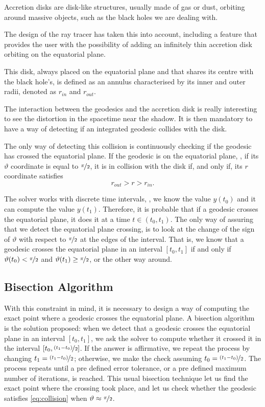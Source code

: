 Accretion disks are disk-like structures, usually made of gas or dust, orbiting around massive objects, such as the black holes we are dealing with.

The design of the ray tracer has taken this into account, including a feature that provides the user with the possibility of adding an infinitely thin accretion disk orbiting on the equatorial plane.

This disk, always placed on the equatorial plane and that shares its centre with the black hole's, is defined as an annulus characterised by its inner and outer radii, denoted as $r_{in}$ and $r_{out}$.

The interaction between the geodesics and the accretion disk is really interesting to see the distortion in the spacetime near the shadow. It is then mandatory to have a way of detecting if an integrated geodesic collides with the disk.

The only way of detecting this collision is continuously checking if the geodesic has crossed the equatorial plane. If the geodesic is on the equatorial plane, \ie, if its $\vartheta$ coordinate is equal to $\nicefrac{\pi}{2}$, it is in collision with the disk if, and only if, its $r$ coordinate satisfies
\begin{equation}
	\label{eq:collision}
	r_{out} > r > r_{in}.
\end{equation}

The solver works with discrete time intervals, \ie, we know the value $y(t_0)$ and it can compute the value $y(t_1)$. Therefore, it is probable that if a geodesic crosses the equatorial plane, it does it at a time $t \in (t_0, t_1)$. The only way of assuring that we detect the equatorial plane crossing, is to look at the change of the sign of $\vartheta$ with respect to $\nicefrac{\pi}{2}$ at the edges of the interval. That is, we know that a geodesic crosses the equatorial plane in an interval $[t_0, t_1]$ if and only if $\vartheta(t_0) < \nicefrac{\pi}{2}$ and $\vartheta(t_1) \geq \nicefrac{\pi}{2}$, or the other way around.

\subsection{Bisection Algorithm}

With this constraint in mind, it is necessary to design a way of computing the exact point where a geodesic crosses the equatorial plane. A bisection algorithm is the solution proposed: when we detect that a geodesic crosses the equatorial plane in an interval $[t_0, t_1]$, we ask the solver to compute whether it crossed it in the interval $[t_0, \nicefrac{(t_1 - t_0)}{2}]$. If the answer is affirmative, we repeat the process by changing $t_1 = \nicefrac{(t_1 - t_0)}{2}$; otherwise, we make the check assuming $t_0 = \nicefrac{(t_1 - t_0)}{2}$. The process repeats until a pre defined error tolerance, or a pre defined maximum number of iterations, is reached. This usual bisection technique let us find the exact point where the crossing took place, and let us check whether the geodesic satisfies \autoref{eq:collision} when $\vartheta \approx \nicefrac{\pi}{2}$.

